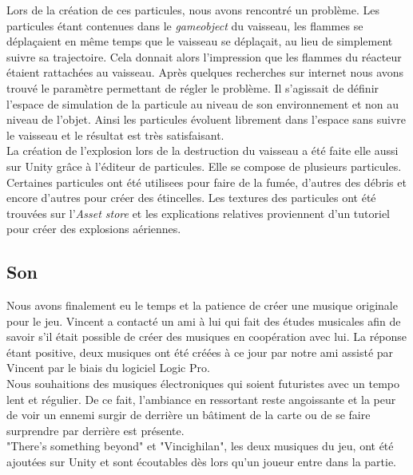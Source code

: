 \documentclass[12pt, titlepage]{article}
\begin{document}
\begin{spacing}{1.5}
Lors de la création de ces particules, nous avons rencontré un problème. Les particules étant contenues dans le \textit{gameobject} du vaisseau, les flammes se déplaçaient en même temps que le vaisseau se déplaçait, au lieu de simplement suivre sa trajectoire. Cela donnait alors l’impression que les flammes du réacteur étaient rattachées au vaisseau. Après quelques recherches sur internet nous avons trouvé le paramètre permettant de régler le problème. Il s'agissait de définir l'espace de simulation de la particule au niveau de son environnement et non au niveau de l'objet. Ainsi les particules évoluent librement dans l’espace sans suivre le vaisseau et le résultat est très satisfaisant.\\

La création de l’explosion lors de la destruction du vaisseau a été faite elle aussi sur Unity grâce à l’éditeur de particules. Elle se compose de plusieurs particules. Certaines particules ont été utilisees pour faire de la fumée, d'autres des débris et encore d'autres pour créer des étincelles. Les textures des particules ont été trouvées sur l’\textit{Asset store} et les explications relatives proviennent d'un tutoriel pour créer des explosions aériennes.\\

\newpage
\subsection{Son}

Nous avons finalement eu le temps et la patience de créer une musique originale pour le jeu. Vincent a contacté un ami à lui qui fait des études musicales afin de savoir s'il était possible de créer des musiques en coopération avec lui. La réponse étant positive, deux musiques ont été créées à ce jour par notre ami assisté par Vincent par le biais du logiciel Logic Pro. \\

Nous souhaitions des musiques électroniques qui soient futuristes avec un tempo lent et régulier. De ce fait, l'ambiance en ressortant reste angoissante et la peur de voir un ennemi surgir de derrière un bâtiment de la carte ou de se faire surprendre par derrière est présente.\\

"There's something beyond" et "Vincighilan", les deux musiques du jeu, ont été ajoutées sur Unity et sont écoutables dès lors qu'un joueur entre dans la partie. \\


\end{spacing}
\end{document}
